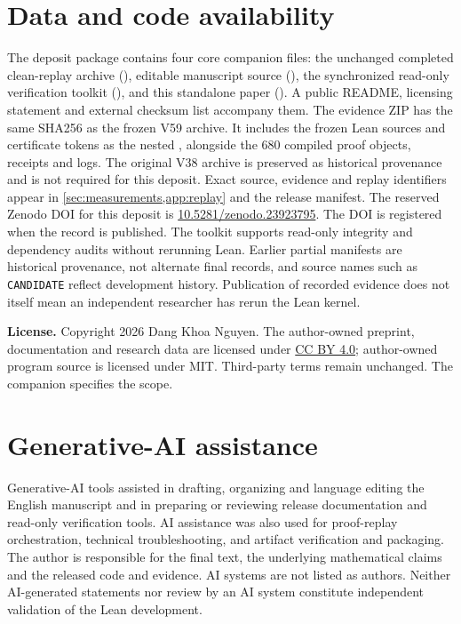 \documentclass[11pt,a4paper]{article}
\theoremstyle{definition}
\newcommand{\code}[1]{\texttt{#1}}
\begin{document}
\section*{Data and code availability}
The deposit package contains four core companion files: the unchanged completed clean-replay archive (), editable manuscript source (), the synchronized read-only verification toolkit (), and this standalone paper (). A public README, licensing statement and external checksum list accompany them. The evidence ZIP has the same SHA256 as the frozen V59 archive. It includes the frozen Lean sources and certificate tokens as the nested , alongside the 680 compiled proof objects, receipts and logs. The original V38 archive is preserved as historical provenance and is not required for this deposit. Exact source, evidence and replay identifiers appear in \cref{sec:measurements,app:replay} and the release manifest. The reserved Zenodo DOI for this deposit is \href{https://doi.org/10.5281/zenodo.23923795}{10.5281/zenodo.23923795}. The DOI is registered when the record is published. The toolkit supports read-only integrity and dependency audits without rerunning Lean. Earlier partial manifests are historical provenance, not alternate final records, and source names such as \code{CANDIDATE} reflect development history. Publication of recorded evidence does not itself mean an independent researcher has rerun the Lean kernel.

\noindent\textbf{License.} Copyright 2026 Dang Khoa Nguyen. The author-owned preprint, documentation and research data are licensed under \href{https://creativecommons.org/licenses/by/4.0/}{CC BY 4.0}; author-owned program source is licensed under MIT. Third-party terms remain unchanged. The companion  specifies the scope.

\section*{Generative-AI assistance}
Generative-AI tools assisted in drafting, organizing and language editing the English manuscript and in preparing or reviewing release documentation and read-only verification tools. AI assistance was also used for proof-replay orchestration, technical troubleshooting, and artifact verification and packaging. The author is responsible for the final text, the underlying mathematical claims and the released code and evidence. AI systems are not listed as authors. Neither AI-generated statements nor review by an AI system constitute independent validation of the Lean development.
\end{document}
